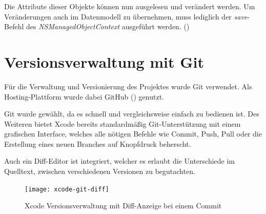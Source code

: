 Die Attribute dieser Objekte können nun ausgelesen und verändert werden. Um Veränderungen auch im Datenmodell zu übernehmen, muss lediglich der \emph{save}-Befehl des \emph{NSManagedObjectContext} ausgeführt werden. (\citet{coredataguide})

\section{Versionsverwaltung mit Git}
\label{sec:tools:git}
Für die Verwaltung und Versionierung des Projektes wurde Git verwendet. Als Hosting-Plattform wurde dabei GitHub (\citet{github}) genutzt.

Git wurde gewählt, da es schnell und vergleichsweise einfach zu bedienen ist. Des Weiteren bietet Xcode bereits standardmäßig Git-Unterstützung mit einem grafischen Interface, welches alle nötigen Befehle wie Commit, Push, Pull oder die Erstellung eines neuen Branches auf Knopfdruck beherscht.

Auch ein Diff-Editor ist integriert, welcher es erlaubt die Unterschiede im Quelltext, zwischen verschiedenen Versionen zu begutachten.

\begin{figure}[htb!]
		  \centering
	\texttt{[image: xcode-git-diff]}
	\caption{Xcode Versionsverwaltung mit Diff-Anzeige bei einem Commit}
	\label{xcode-git-diff}
\end{figure}


